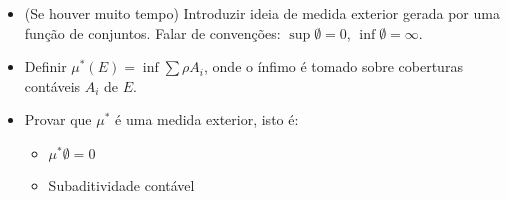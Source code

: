 \documentclass{article}
\begin{document}
\begin{itemize}
\item (Se houver muito tempo) Introduzir ideia de medida exterior gerada por uma função de conjuntos. Falar de convenções: $\sup \emptyset = 0$, $\inf \emptyset = \infty$.
\item Definir $\mu^*(E) = \inf \sum \rho A_i$, onde o ínfimo é tomado sobre coberturas contáveis $A_i$ de $E$.
\item Provar que $\mu^*$ é uma medida exterior, isto é:
\begin{itemize}
\item $\mu^* \emptyset = 0$
\item Subaditividade contável
\end{itemize}
\end{itemize}
\end{document}
